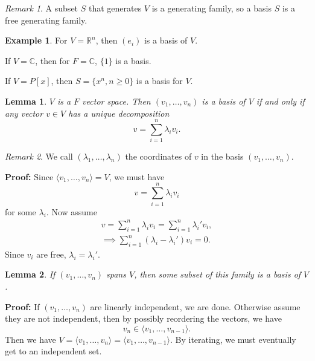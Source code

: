 \documentclass[12pt]{article}
\newtheorem{lemma}{Lemma}[section]
\theoremstyle{definition}
\newtheorem{example}{Example}[section]
\theoremstyle{remark}
\newtheorem*{remark}{Remark}
\begin{document}
\begin{remark}
	A subset $S$ that generates $V$ is a generating family, so a basis $S$ is a free generating family.
\end{remark}

\begin{adjustbox}{minipage = \columnwidth - 25.5pt, margin=1em, frame=1pt, margin=0em}
\begin{example}
	For $V = \mathbb{R}^{n}$, then $(e_i)$ is a basis of $V$.

	If $V = \mathbb{C}$, then for $F = \mathbb{C}$, $\{1\}$ is a basis.

	If $V = P[x]$, then $S = \{x^{n}, n \geq 0\}$ is a basis for $V$.
\end{example}

\end{adjustbox}

\begin{lemma}
	$V$ is a $F$ vector space. Then $(v_1, \ldots, v_n)$ is a basis of $V$ if and only if any vector $v \in V$ has a unique decomposition
	\[
	v = \sum_{i = 1}^{n} \lambda_i v_i
	.\]
\end{lemma}

\begin{remark}
	We call $(\lambda_1, \ldots, \lambda_n)$ the coordinates of $v$ in the basis $(v_1, \ldots, v_n)$.
\end{remark}

\begin{adjustbox}{minipage = \columnwidth - 25.5pt, margin=1em, frame=1pt, margin=0em}
	\textbf{Proof:} Since $\langle v_1, \ldots, v_n \rangle = V$, we must have 
	\[
	v = \sum_{i = 1}^{n} \lambda_i v_i
	\]
	for some $\lambda_i$. Now assume
	\begin{align*}
		v = \sum_{i = 1}^{n}\lambda_i v_i = \sum_{i = 1}^{n}\lambda_i' v_i, \\
		\implies \sum_{i = 1}^{n}(\lambda_i - \lambda_i') v_i = 0.
	\end{align*}
	Since $v_i$ are free, $\lambda_i = \lambda_i'$.
\end{adjustbox}

\begin{lemma}
	If $(v_1, \ldots, v_n)$ spans $V$, then some subset of this family is a basis of $V$.
\end{lemma}

\begin{adjustbox}{minipage = \columnwidth - 25.5pt, margin=1em, frame=1pt, margin=0em}
	\textbf{Proof:} If $(v_1, \ldots, v_n)$ are linearly independent, we are done. Otherwise assume they are not independent, then by possibly reordering the vectors, we have
	\[
		v_n \in \langle v_1, \ldots, v_{n-1}\rangle
	.\]
	Then we have $V = \langle v_1, \ldots, v_n \rangle = \langle v_1, \ldots, v_{n-1}\rangle$.
	By iterating, we must eventually get to an independent set.
\end{adjustbox}
\end{document}
